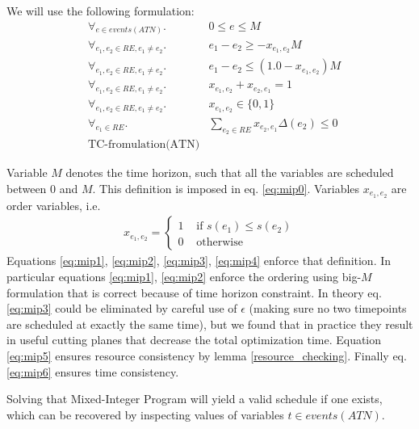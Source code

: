 We will use the following formulation:
\begin{align}
\label{eq:mip0} & \forall_{e \in events(ATN)}.              & 0 \leq e \leq M \\
\label{eq:mip1} & \forall_{e_1, e_2 \in RE, e_1 \neq e_2}. & e_1 - e_2 \geq - x_{e_1,e_2} M \\
\label{eq:mip2} & \forall_{e_1, e_2 \in RE, e_1 \neq e_2}. & e_1 - e_2 \leq (1.0 - x_{e_1,e_2}) M\\
\label{eq:mip3} & \forall_{e_1, e_2 \in RE, e_1 \neq e_2}. & x_{e_1,e_2} + x_{e_2,e_1}  = 1\\
\label{eq:mip4} & \forall_{e_1, e_2 \in RE, e_1 \neq e_2}. & x_{e_1,e_2} \in \{ 0, 1 \} \\
\label{eq:mip5} & \forall_{e_1 \in RE}.                    & \sum_{e_2 \in RE} x_{e_2, e_1} \Delta(e_2) \leq 0\\
\label{eq:mip6} & \text{TC-fromulation(ATN)}
\end{align}

Variable $M$ denotes the time horizon, such that all the variables are scheduled between $0$ and $M$. This definition is imposed in eq. \ref{eq:mip0}.
Variables $x_{e_1,e_2}$ are order variables, i.e.
\begin{align*}
x_{e_1, e_2} = \begin{cases}
1 &\text{ if }s(e_1) \leq s(e_2) \\
0 &\text{ otherwise}
\end{cases}
\end{align*}
Equations \ref{eq:mip1}, \ref{eq:mip2}, \ref{eq:mip3}, \ref{eq:mip4} enforce that definition. In particular equations \ref{eq:mip1}, \ref{eq:mip2} enforce the ordering using big-$M$ formulation that is correct because of time horizon constraint. In theory eq. \ref{eq:mip3} could be eliminated by careful use of $\epsilon$ (making sure no two timepoints are scheduled at exactly the same time), but we found that in practice they result in useful cutting planes that decrease the total optimization time. Equation \ref{eq:mip5} ensures resource consistency by lemma \ref{resource_checking}. Finally eq. \ref{eq:mip6} ensures time consistency.

Solving that Mixed-Integer Program will yield a valid schedule if one exists, which can be recovered by inspecting values of variables $t \in events(ATN)$.


